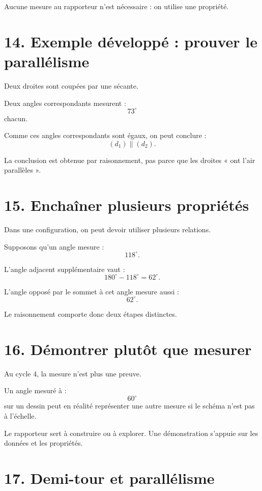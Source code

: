 Aucune mesure au rapporteur n'est nécessaire : on utilise une propriété.

\section{14. Exemple développé : prouver le parallélisme}

Deux droites sont coupées par une sécante.

Deux angles correspondants mesurent :
\[
73^\circ
\]
chacun.

Comme ces angles correspondants sont égaux, on peut conclure :
\[
\boxed{(d_1)\parallel(d_2)}.
\]

La conclusion est obtenue par raisonnement, pas parce que les droites « ont l'air parallèles ».

\section{15. Enchaîner plusieurs propriétés}

Dans une configuration, on peut devoir utiliser plusieurs relations.

Supposons qu'un angle mesure :
\[
118^\circ.
\]

L'angle adjacent supplémentaire vaut :
\[
180^\circ-118^\circ=62^\circ.
\]

L'angle opposé par le sommet à cet angle mesure aussi :
\[
62^\circ.
\]

Le raisonnement comporte donc deux étapes distinctes.

\section{16. Démontrer plutôt que mesurer}

Au cycle 4, la mesure n'est plus une preuve.

Un angle mesuré à :
\[
60^\circ
\]
sur un dessin peut en réalité représenter une autre mesure si le schéma n'est pas à l'échelle.

\begin{attention}
Le rapporteur sert à construire ou à explorer. Une démonstration s'appuie sur les données et les propriétés.
\end{attention}

\section{17. Demi-tour et parallélisme}


